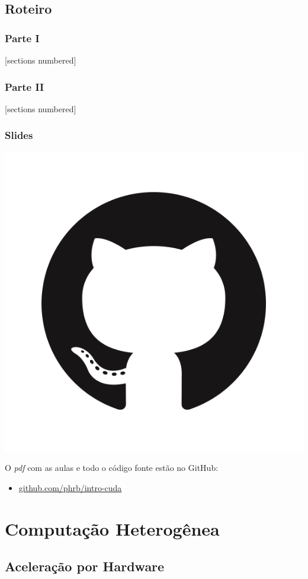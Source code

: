 \documentclass[10pt, compress]{beamer}
\begin{document}
\subsection{Roteiro}

\begin{frame}
    \frametitle{Parte I}
    [sections numbered]
    \tableofcontents[hideallsubsections, part=1]
\end{frame}

\begin{frame}
    \frametitle{Parte II}
    [sections numbered]
    \tableofcontents[hideallsubsections, part=2]
\end{frame}

\begin{frame}
    \frametitle{Slides}
    \begin{center}
        \includegraphics[width=.18\textwidth]{github}
    \end{center}
    O \emph{pdf} com as aulas e todo o código fonte estão no \alert{GitHub}:

    \begin{itemize}
        \item \url{github.com/phrb/intro-cuda}
    \end{itemize}
\end{frame}


\section{Computação Heterogênea}

\subsection{Aceleração por Hardware}
\end{document}
